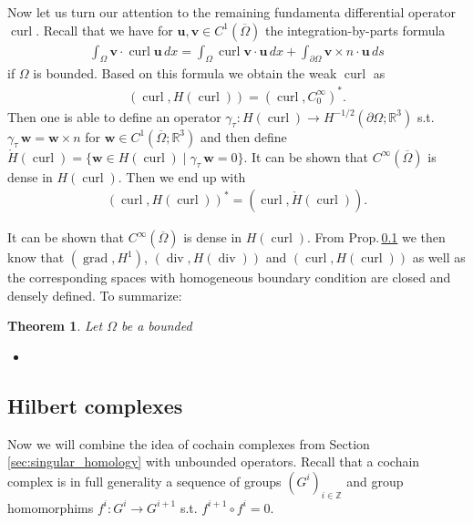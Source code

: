 \documentclass[12pt,a4paper]{article}
\numberwithin{equation}{subsection}
\numberwithin{lemma}{subsection}
\newtheorem{theorem}[lemma]{Theorem}
\theoremstyle{definition}
\DeclareMathOperator{\curl}{curl}
\DeclareMathOperator{\diver}{div}
\DeclareMathOperator{\grad}{grad}
\newcommand{\integers}{\mathbb{Z}}
\newcommand{\real}{\mathbb{R}}
\begin{document}
Now let us turn our attention to the remaining fundamenta differential operator 
$\curl$. Recall that we have for 
$\mathbf{u}, \mathbf{v} \in C^1(\overline{\Omega})$ the integration-by-parts 
formula
\begin{align*}
    \int_\Omega \mathbf{v} \cdot \curl \mathbf{u} \, dx 
    = \int_\Omega \curl \mathbf{v} \cdot \mathbf{u} \, dx 
        + \int_{\partial \Omega} \mathbf{v} \times n \cdot \mathbf{u} \, ds 
\end{align*}
if $\Omega$ is bounded. Based on this formula
we obtain the weak $\curl$ as
\begin{align*}
    (\curl, H(\curl)) = (\curl, C_0^\infty)^*.
\end{align*}
Then one is able to define an operator $\gamma_\tau: H(\curl) \rightarrow 
H^{-1/2}(\partial \Omega; \real^3)$ s.t. 
$\gamma_\tau \, \mathbf{w} = \mathbf{w}\times n$ for $\mathbf{w} \in 
C^1(\overline{\Omega};\real^3)$ and then define 
$\mathring{H}(\curl) = \{ \mathbf{w} \in H(\curl) 
\mid \gamma_\tau \, \mathbf{w} = 0 \}$. 
It can be shown that $C^\infty(\overline{\Omega})$ is dense in $H(\curl)$.
Then we end up with
\begin{align*}
    (\curl, H(\curl))^* = (\curl, \mathring{H}(\curl)).
\end{align*}

It can be shown that $C^\infty(\overline{\Omega})$ is dense in $H(\curl)$.
From Prop.\,\ref{} we then know that $(\grad, H^1)$, $(\diver, H(\diver))$ 
and $(\curl, H(\curl))$ as well as the corresponding spaces with homogeneous 
boundary condition are closed and densely defined. To summarize:

\begin{theorem}
    Let $\Omega$ be a bounded
    \begin{itemize}
        \item 
    \end{itemize}
\end{theorem}

\subsection{Hilbert complexes}

Now we will combine the idea of cochain complexes from Section 
\ref{sec:singular_homology} 
with unbounded operators. Recall that a cochain complex 
is in full generality a sequence of groups $(G^i)_{i\in \integers}$ 
and group homomorphims $f^i: G^i \rightarrow G^{i+1}$ s.t. 
$f^{i+1} \circ f^{i} = 0$.
\end{document}

